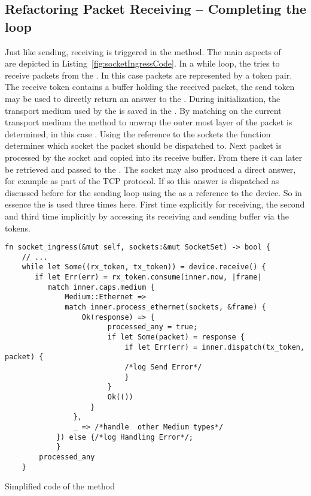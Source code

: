 \subsection{Refactoring Packet Receiving -- Completing the  loop}
\label{subsec:refactorReceiving}
Just like sending, receiving is triggered in the  method. The main aspects of \\  are depicted in Listing~\ref{fig:socketIngressCode}. In a while loop, the \stack{} tries to receive packets from the \dev{}. In this case packets are represented by a token pair. The receive token  contains a buffer holding the received packet, the send token  may be used to directly return an answer to the \dev{}. During initialization, the transport medium used by the \dev{} is saved in the \stack{}. By matching on the current transport medium the method to unwrap the outer most layer of the packet is determined, in this case . Using the reference to the sockets the function determines which socket the packet should be dispatched to. Next packet is processed by the socket and copied into its receive buffer. From there it can later be retrieved and passed to the \store{}. The socket may also produced a direct answer, for example as part of the TCP protocol. If so this answer is dispatched as discussed before for the sending loop using the  as a reference to the device. So in essence the \dev{} is used three times here. First time explicitly for receiving, the second and third time implicitly by accessing its receiving and sending buffer via the tokens.
\begin{codefigure}[H]
    \centering
\begin{verbatim}
fn socket_ingress(&mut self, sockets:&mut SocketSet) -> bool {
    // ... 
    while let Some((rx_token, tx_token)) = device.receive() {
       if let Err(err) = rx_token.consume(inner.now, |frame| 
          match inner.caps.medium {
              Medium::Ethernet => 
              match inner.process_ethernet(sockets, &frame) {
                  Ok(response) => {
                        processed_any = true;
                        if let Some(packet) = response {
                            if let Err(err) = inner.dispatch(tx_token, packet) {
                            /*log Send Error*/
                            }
                        }
                        Ok(())
                    }
                },
                _ => /*handle  other Medium types*/
            }) else {/*log Handling Error*/;
            }
        processed_any
    }
\end{verbatim}
    \caption{Simplified code of the  method}
    \label{fig:socketIngressCode}
\end{codefigure}

